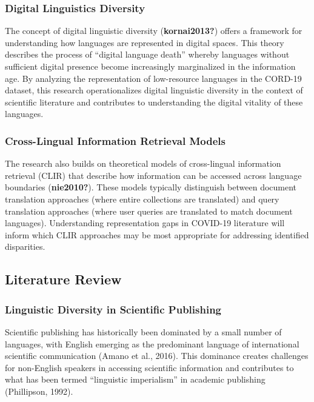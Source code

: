 \documentclass[
]{article}
\begin{document}
\subsubsection{Digital Linguistics
Diversity}\label{digital-linguistics-diversity}

The concept of digital linguistic diversity (\textbf{kornai2013?})
offers a framework for understanding how languages are represented in
digital spaces. This theory describes the process of ``digital language
death'' whereby languages without sufficient digital presence become
increasingly marginalized in the information age. By analyzing the
representation of low-resource languages in the CORD-19 dataset, this
research operationalizes digital linguistic diversity in the context of
scientific literature and contributes to understanding the digital
vitality of these languages.

\subsubsection{Cross-Lingual Information Retrieval
Models}\label{cross-lingual-information-retrieval-models}

The research also builds on theoretical models of cross-lingual
information retrieval (CLIR) that describe how information can be
accessed across language boundaries (\textbf{nie2010?}). These models
typically distinguish between document translation approaches (where
entire collections are translated) and query translation approaches
(where user queries are translated to match document languages).
Understanding representation gaps in COVID-19 literature will inform
which CLIR approaches may be most appropriate for addressing identified
disparities.

\subsection{Literature Review}\label{literature-review}

\subsubsection{Linguistic Diversity in Scientific
Publishing}\label{linguistic-diversity-in-scientific-publishing}

Scientific publishing has historically been dominated by a small number
of languages, with English emerging as the predominant language of
international scientific communication (Amano et al., 2016). This
dominance creates challenges for non-English speakers in accessing
scientific information and contributes to what has been termed
``linguistic imperialism'' in academic publishing (Phillipson, 1992).
\end{document}
